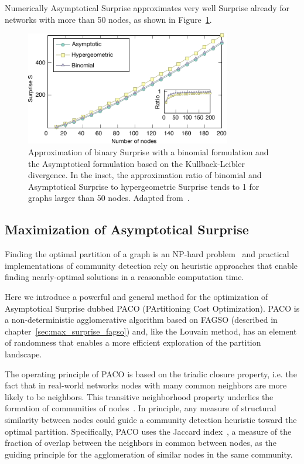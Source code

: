 Numerically Asymptotical Surprise approximates very well Surprise already for networks with more than 50 nodes, as shown in Figure~\ref{fig:asymptotical_surprise_comparison}.

\begin{figure}[htb!]
\centering
\includegraphics[width=0.8\textwidth]{images/asymptotical_surprise_comparison.pdf}
\caption{Approximation of binary Surprise with a binomial formulation and the Asymptotical formulation based on the Kullback-Leibler divergence. In the inset, the approximation ratio of binomial and Asymptotical Surprise to hypergeometric Surprise tends to 1 for graphs larger than 50 nodes. Adapted from~\cite{traag2015}.}
\label{fig:asymptotical_surprise_comparison}
\end{figure}


\subsection{Maximization of Asymptotical Surprise}
Finding the optimal partition of a graph is an NP-hard problem~\cite{fortunato2010} and practical implementations of community detection rely on heuristic approaches that enable finding nearly-optimal solutions in a reasonable computation time.

Here we introduce a powerful and general method for the optimization of Asymptotical Surprise dubbed PACO (PArtitioning Cost Optimization). PACO is a non-deterministic agglomerative algorithm based on FAGSO (described in chapter~\ref{sec:max_surprise_fagso}) and, like the Louvain method, has an element of randomness that enables a more efficient exploration of the partition landscape.

The operating principle of PACO is based on the triadic closure property, i.e. the fact that in real-world networks nodes with many common neighbors are more likely to be neighbors. This transitive neighborhood property underlies the formation of communities of nodes~\cite{bianconi2014,eustace2015}. In principle, any measure of structural similarity between nodes could guide a community detection heuristic toward the optimal partition. Specifically, PACO uses the Jaccard index~\cite{jaccard1901}, a measure of the fraction of overlap between the neighbors in common between nodes, as the guiding principle for the agglomeration of similar nodes in the same community.

